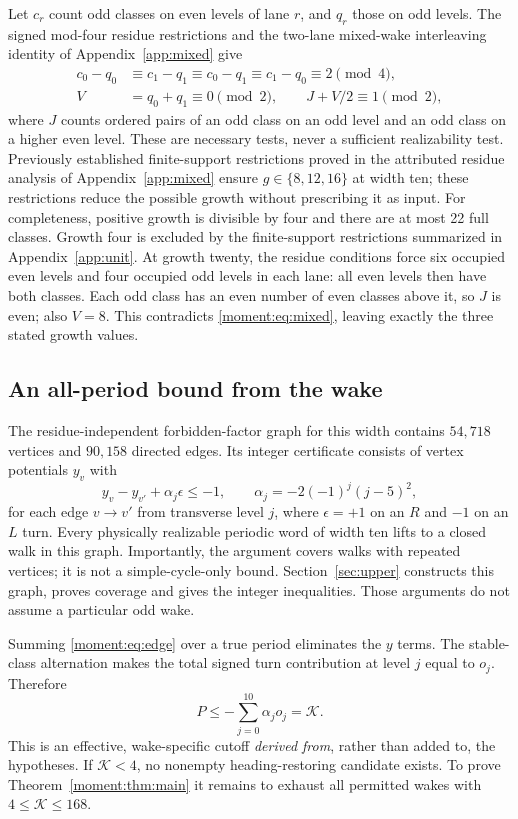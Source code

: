 Let $c_r$ count odd classes on even levels of lane $r$, and $q_r$ those on odd
levels. The signed mod-four residue restrictions and the two-lane mixed-wake
interleaving identity of Appendix~\ref{app:mixed} give
\begin{align}
 c_0-q_0&\equiv c_1-q_1\equiv c_0-q_1\equiv c_1-q_0\equiv2\pmod4,\label{moment:eq:mod4}\\
 V&=q_0+q_1\equiv0\pmod2,\qquad J+V/2\equiv1\pmod2,\label{moment:eq:mixed}
\end{align}
where $J$ counts ordered pairs of an odd class on an odd level and an odd
class on a higher even level. These are necessary tests, never a sufficient
realizability test. Previously established finite-support restrictions proved in the attributed residue analysis of Appendix~\ref{app:mixed}
ensure $g\in\{8,12,16\}$ at width ten; these restrictions reduce the possible growth without prescribing it as input.
For completeness, positive growth is divisible by four and there are at most
22 full classes. Growth four is excluded by the finite-support restrictions
summarized in Appendix~\ref{app:unit}. At growth twenty, the residue
conditions force six occupied even levels and four occupied odd levels in each
lane: all even levels then have both classes. Each odd class has an even number
of even classes above it, so $J$ is even; also $V=8$. This contradicts
\eqref{moment:eq:mixed}, leaving exactly the three stated growth values.

\subsection{An all-period bound from the wake}
The residue-independent forbidden-factor graph for this
width contains $54,718$ vertices and $90,158$ directed edges. Its integer
certificate consists of vertex potentials $y_v$ with
\begin{equation}\label{moment:eq:edge}
 y_v-y_{v'}+\alpha_j\epsilon\le-1,
 \qquad \alpha_j=-2(-1)^j(j-5)^2,
\end{equation}
for each edge $v\to v'$ from transverse level $j$, where $\epsilon=+1$ on
an $R$ and $-1$ on an $L$ turn. Every physically realizable periodic word of
width ten lifts to a closed walk in this graph. Importantly, the argument
covers walks with repeated vertices; it is not a simple-cycle-only bound.
Section~\ref{sec:upper} constructs this graph, proves coverage and gives
the integer inequalities. Those arguments do not assume a particular odd wake.

Summing \eqref{moment:eq:edge} over a true period eliminates the $y$ terms.
The stable-class alternation makes the total signed turn contribution at level
$j$ equal to $o_j$. Therefore
\begin{equation}\label{moment:eq:bound}
 P\le-\sum_{j=0}^{10}\alpha_jo_j=\mathcal K.
\end{equation}
This is an effective, wake-specific cutoff \emph{derived from}, rather than
added to, the hypotheses. If $\mathcal K<4$, no nonempty heading-restoring
candidate exists. To prove Theorem~\ref{moment:thm:main} it remains to exhaust all
permitted wakes with $4\le\mathcal K\le168$.

